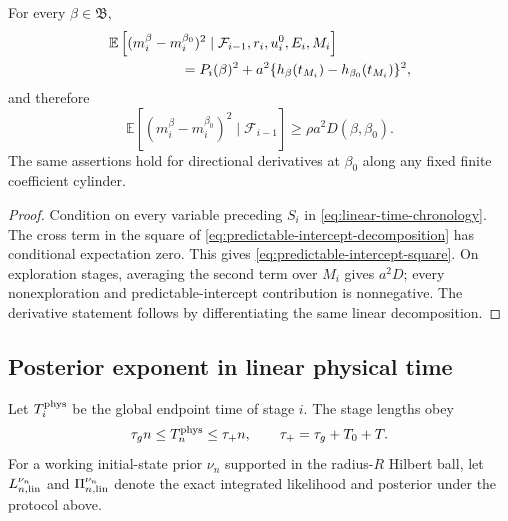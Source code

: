 \begin{lemma}
\label{lem:predictable-intercept-information}
For every \(\beta\in\mathfrak B\),
\begin{align}
 &\mathbb E\left[
 (m_i^\beta-m_i^{\beta_0})^2
 \mid\mathcal F_{i-1},r_i,u_i^0,E_i,M_i\right]\notag\\
 &\hspace{18mm}=P_i(\beta)^2
 +a^2\{h_\beta(t_{M_i})-h_{\beta_0}(t_{M_i})\}^2,
 \label{eq:predictable-intercept-square}
\end{align}
and therefore
\begin{equation}
 \mathbb E\left[(m_i^\beta-m_i^{\beta_0})^2
 \mid\mathcal F_{i-1}\right]
 \ge \rho a^2D(\beta,\beta_0).
 \label{eq:linear-time-information-floor}
\end{equation}
The same assertions hold for directional derivatives at \(\beta_0\) along
any fixed finite coefficient cylinder.
\end{lemma}

\begin{proof}
Condition on every variable preceding \(S_i\) in
\eqref{eq:linear-time-chronology}.  The cross term in the square of
\eqref{eq:predictable-intercept-decomposition} has conditional expectation
zero.  This gives \eqref{eq:predictable-intercept-square}.  On exploration
stages, averaging the second term over \(M_i\) gives \(a^2D\); every
nonexploration and predictable-intercept contribution is nonnegative.  The
derivative statement follows by differentiating the same linear
decomposition.
\end{proof}

\subsection{Posterior exponent in linear physical time}

Let \(T_i^{\rm phys}\) be the global endpoint time of stage \(i\).  The stage
lengths obey
\begin{equation}
 \tau_g n\le T_n^{\rm phys}
 \le \tau_+n,
 \qquad \tau_+=\tau_g+T_0+T.
 \label{eq:linear-physical-time}
\end{equation}
For a working initial-state prior \(\nu_n\) supported in the radius-\(R\)
Hilbert ball, let \(L_{n,{\rm lin}}^{\nu_n}\) and
\(\Pi_{n,{\rm lin}}^{\nu_n}\) denote the exact integrated likelihood and
posterior under the protocol above.

